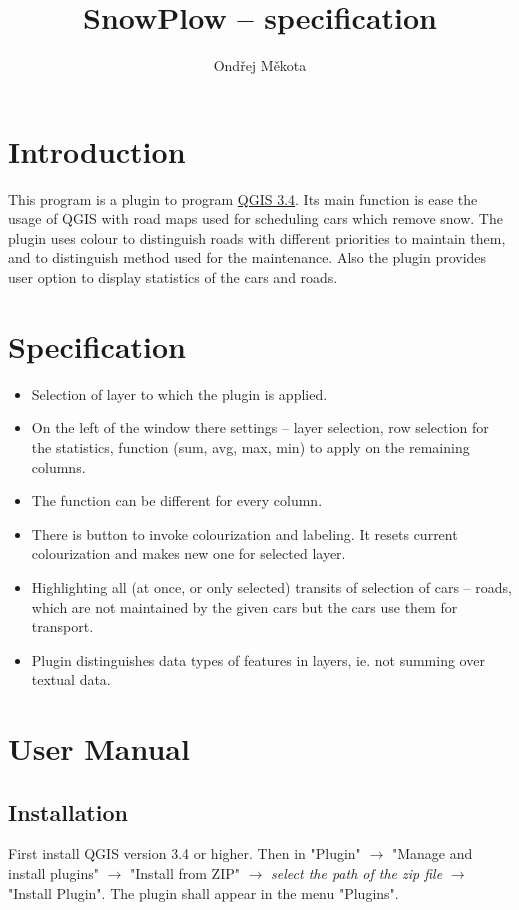 \documentclass[12pt,a4paper]{article}
\begin{document}
\title{SnowPlow – specification}
\author{Ondřej Měkota}

\maketitle
\pagebreak
\tableofcontents
\pagebreak
\section{Introduction}

\par This program is a plugin to program \href{https://qgis.org/en/site/index.html}{QGIS 3.4}. 
Its main function is ease the usage of QGIS with road maps used for scheduling cars which remove snow.
The plugin uses colour to distinguish roads with different priorities to maintain them, and to distinguish method used for the maintenance. 
Also the plugin provides user option to display statistics of the cars and roads.

\section{Specification}
\begin{itemize}
    \item Selection of layer to which the plugin is applied.
    \item On the left of the window there settings – layer selection, row selection for the statistics, function (sum, avg, max, min) to apply on the remaining columns.
    \item The function can be different for every column.
    \item There is button to invoke colourization and labeling. It resets current colourization and makes new one for selected layer.
    \item Highlighting all (at once, or only selected) transits of selection of cars – roads, which are not maintained by the given cars but the cars use them for transport. 
    \item Plugin distinguishes data types of features in layers, ie. not summing over textual data. 
\end{itemize}

\pagebreak
\section{User Manual}
\subsection{Installation}
First install QGIS version 3.4 or higher. 
Then in "Plugin" $\rightarrow$ "Manage and install plugins" $\rightarrow$ "Install from ZIP" $\rightarrow$ \emph{select the path of the zip file} $\rightarrow$ "Install Plugin".
The plugin shall appear in the menu "Plugins".
\end{document}
